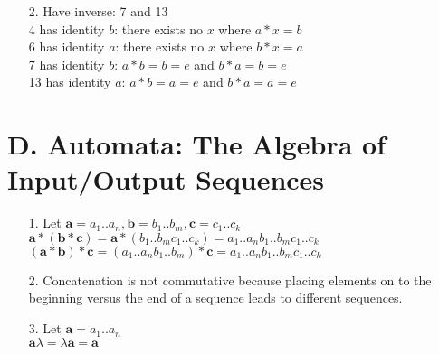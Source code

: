 \begin{enumerate}
\begin{enumerate}
\item[2.]
Have inverse: 7 and 13 \\
4 has identity $b$: there exists no $x$ where $a*x=b$\\
6 has identity $a$: there exists no $x$ where $b*x=a$\\
7 has identity $b$: $a*b=b=e$ and $b*a=b=e$\\
13 has identity $a$: $a*b=a=e$ and $b*a=a=e$\\

\end{enumerate}

\section*{D. Automata: The Algebra of Input/Output Sequences}

\begin{enumerate}

\item[1.]
Let $\boldsymbol{a}=a_{1}..a_{n}, \boldsymbol{b}=b_{1}..b_{m}, \boldsymbol{c}=c_{1}..c_{k}$ \\
$\boldsymbol{a}*(\boldsymbol{b}*\boldsymbol{c})=\boldsymbol{a}*(b_{1}..b_{m}c_{1}..c_{k})=a_{1}..a_{n}b_{1}..b_{m}c_{1}..c_{k}$ \\
$(\boldsymbol{a}*\boldsymbol{b})*\boldsymbol{c}=(a_{1}..a_{n}b_{1}..b_{m})*\boldsymbol{c}=a_{1}..a_{n}b_{1}..b_{m}c_{1}..c_{k}$

\item[2.]
Concatenation is not commutative because placing elements on to the beginning 
versus the end of a sequence leads to different sequences.

\item[3.]
Let $\boldsymbol{a}=a_{1}..a_{n}$ \\
$\boldsymbol{a} \lambda=\lambda \boldsymbol{a} = \boldsymbol{a}$ \\


\end{enumerate}

\end{enumerate}